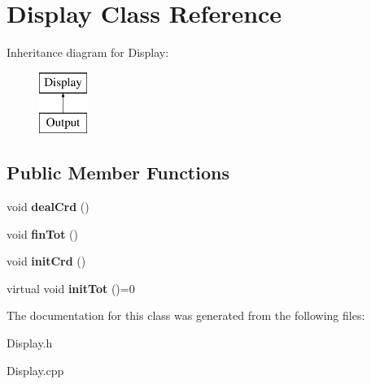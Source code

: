 \hypertarget{class_display}{}\section{Display Class Reference}
\label{class_display}
Inheritance diagram for Display\+:\begin{figure}[H]
\begin{center}
\leavevmode
\includegraphics[height=2.000000cm]{class_display}
\end{center}
\end{figure}
\subsection*{Public Member Functions}
\begin{DoxyCompactItemize}
\item 
\mbox{\label{class_display_a212a12c3e6c2c1dcc9e88fdf7e8da224}} 
void {\bfseries deal\+Crd} ()
\item 
\mbox{\label{class_display_a44b1ab920cc67ce1f84606156db4bf5a}} 
void {\bfseries fin\+Tot} ()
\item 
\mbox{\label{class_display_ab77dd392d09cd930177ee5a5efb4066a}} 
void {\bfseries init\+Crd} ()
\item 
\mbox{\label{class_display_a77b86efa31777686d0abc9522e1bfb4c}} 
virtual void {\bfseries init\+Tot} ()=0
\end{DoxyCompactItemize}


The documentation for this class was generated from the following files\+:\begin{DoxyCompactItemize}
\item 
Display.\+h\item 
Display.\+cpp\end{DoxyCompactItemize}
